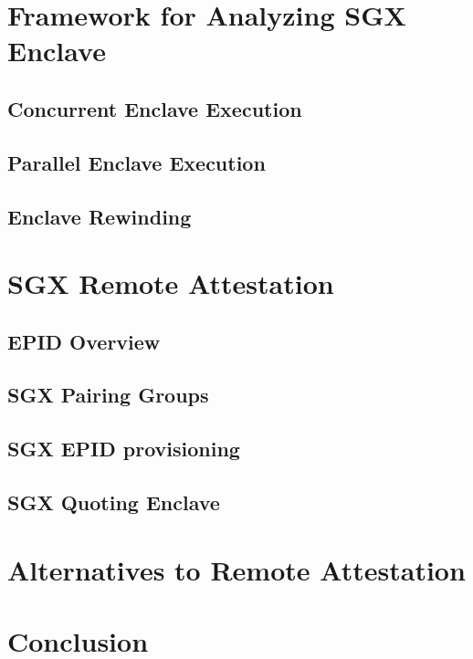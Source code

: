 \documentclass[11pt]{article}
\begin{document}
  \section{Framework for Analyzing SGX Enclave}
  \subsection{Concurrent Enclave Execution}
  \subsection{Parallel Enclave Execution}
  \subsection{Enclave Rewinding}

  \section{SGX Remote Attestation}
  \subsection{EPID Overview}
  \subsection{SGX Pairing Groups}
  \subsection{SGX EPID provisioning}
  \subsection{SGX Quoting Enclave}

  \section{Alternatives to Remote Attestation}
  \section{Conclusion}



\end{document}
